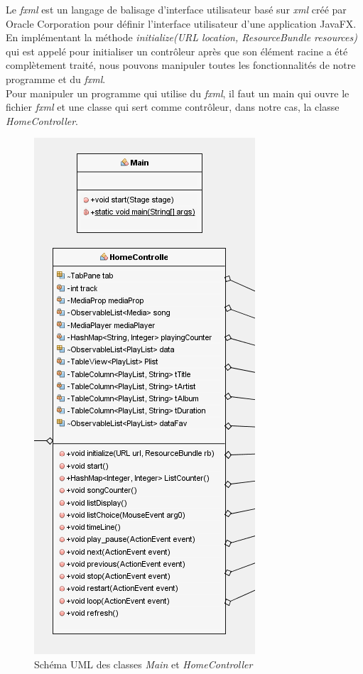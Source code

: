 \documentclass[a4paper,12pt]{report} %
\begin{document}
	Le \textit{fxml} est un langage de balisage d'interface utilisateur basé sur \textit{xml} créé par Oracle Corporation pour définir l'interface utilisateur d'une application JavaFX.\\
En implémentant la méthode \textit{initialize(URL location, ResourceBundle resources)} qui est appelé pour initialiser un contrôleur après que son élément racine a été complètement traité, nous pouvons manipuler toutes les fonctionnalités de notre programme et du \textit{fxml}.\\
	
	Pour manipuler un programme qui utilise du \textit{fxml}, il faut un main qui ouvre le fichier \textit{fxml} et une classe qui sert comme contrôleur, dans notre cas, la classe \textit{HomeController}.
	
	\begin{figure}[ht] 		
		\centering
  		\includegraphics[scale=0.7]{Main-C} 
  		\caption{Schéma UML des classes \textit{Main} et \textit{HomeController}}
	\end{figure}
	\vspace{1cm}
	
\end{document}
